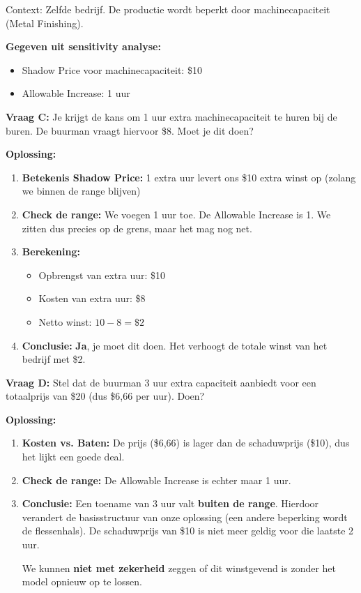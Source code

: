 \documentclass[a4paper,11pt]{article}
\begin{document}
\begin{oefenblok}[title=Oefening 2: Verandering in Beperkingen (Shadow Prices)]
    Context: Zelfde bedrijf. De productie wordt beperkt door machinecapaciteit (Metal Finishing).
    
    \textbf{Gegeven uit sensitivity analyse:}
    \begin{itemize}
        \item Shadow Price voor machinecapaciteit: \$10
        \item Allowable Increase: 1 uur
    \end{itemize}
    
    \textbf{Vraag C:} Je krijgt de kans om 1 uur extra machinecapaciteit te huren bij de buren. 
    De buurman vraagt hiervoor \$8. Moet je dit doen?
    
    \textbf{Oplossing:}
    \begin{enumerate}
        \item \textbf{Betekenis Shadow Price:} 1 extra uur levert ons \$10 extra winst op (zolang we binnen de range blijven)
        \item \textbf{Check de range:} We voegen 1 uur toe. De Allowable Increase is 1. 
        We zitten dus precies op de grens, maar het mag nog net.
        \item \textbf{Berekening:}
        \begin{itemize}
            \item Opbrengst van extra uur: \$10
            \item Kosten van extra uur: \$8
            \item Netto winst: $10 - 8 = \$2$
        \end{itemize}
        \item \textbf{Conclusie:} \textbf{Ja}, je moet dit doen. Het verhoogt de totale winst van het bedrijf met \$2.
    \end{enumerate}
    
    \vspace{5mm}
    
    \textbf{Vraag D:} Stel dat de buurman 3 uur extra capaciteit aanbiedt voor een totaalprijs van \$20 
    (dus \$6,66 per uur). Doen?
    
    \textbf{Oplossing:}
    \begin{enumerate}
        \item \textbf{Kosten vs. Baten:} De prijs (\$6,66) is lager dan de schaduwprijs (\$10), 
        dus het lijkt een goede deal.
        \item \textbf{Check de range:} De Allowable Increase is echter maar 1 uur.
        \item \textbf{Conclusie:} Een toename van 3 uur valt \textbf{buiten de range}. 
        Hierdoor verandert de basisstructuur van onze oplossing (een andere beperking wordt de flessenhals). 
        De schaduwprijs van \$10 is niet meer geldig voor die laatste 2 uur. 
        
        We kunnen \textbf{niet met zekerheid} zeggen of dit winstgevend is zonder het model opnieuw op te lossen.
    \end{enumerate}
\end{oefenblok}
\end{document}
